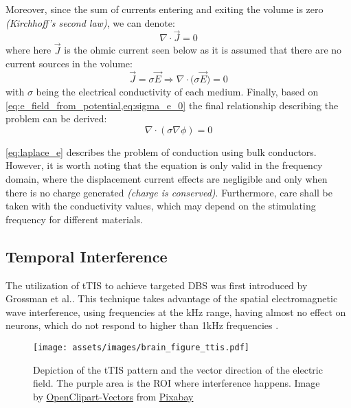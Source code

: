 \noindent Moreover, since the sum of currents entering and exiting the volume is zero \textit{(Kirchhoff's second law)}, we can denote:
\begin{equation}
    \nabla\cdot\vec{J} = 0
\end{equation}
where here $\vec{J}$ is the ohmic current seen below as it is assumed that there are no current sources in the volume:
\begin{equation}
    \label{eq:sigma_e_0}
    \vec{J} = \sigma\vec{E}\Rightarrow\boxed{\nabla\cdot\big(\sigma\vec{E}\big) = 0}
\end{equation}
with $\sigma$ being the electrical conductivity of each medium. Finally, based on \cref{eq:e_field_from_potential,eq:sigma_e_0} the final relationship describing the problem can be derived:
\begin{equation}
    \label{eq:laplace_e}
    \boxed{\nabla\cdot(\sigma\nabla\phi) = 0}
\end{equation}

\autoref{eq:laplace_e} describes the problem of conduction using bulk conductors. However, it is worth noting that the equation is only valid in the frequency domain, where the displacement current effects are negligible and only when there is no charge generated \textit{(charge is conserved)}. Furthermore, care shall be taken with the conductivity values, which may depend on the stimulating frequency for different materials.

\pagebreak
\subsection{Temporal Interference}
The utilization of \gls{tTIS} to achieve targeted \gls{DBS} was first introduced by Grossman et al.\cite{Grossman2017}. This technique takes advantage of the spatial electromagnetic wave interference, using frequencies at the \si{kHz} range, having almost no effect on neurons, which do not respond to higher than 1\si{kHz} frequencies \cite{Hutcheon2000}.
\\\vspace{1pt}

\begin{wrapfigure}{r}{0.48\textwidth}
    \vspace{-10pt}
    \centering
    \texttt{[image: assets/images/brain\_figure\_ttis.pdf]}
    \caption[Depiction of the \gls{tTIS} pattern and the vector direction of the electric field. The purple area is the \gls{ROI} where interference happens.]{Depiction of the \gls{tTIS} pattern and the vector direction of the electric field. The purple area is the \gls{ROI} where interference happens. Image by \href{https://pixabay.com/users/openclipart-vectors-30363/?utm_source=link-attribution&amp;utm_medium=referral&amp;utm_campaign=image&amp;utm_content=150935}{OpenClipart-Vectors} from \href{https://pixabay.com/?utm_source=link-attribution&amp;utm_medium=referral&amp;utm_campaign=image&amp;utm_content=150935}{Pixabay}}
    \label{fig:brain_elec_demo}
\end{wrapfigure}


